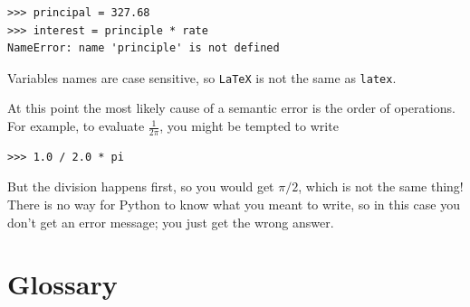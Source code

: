\documentclass[10pt]{book}
\begin{document}
\begin{verbatim}
>>> principal = 327.68
>>> interest = principle * rate
NameError: name 'principle' is not defined
\end{verbatim}
%
Variables names are case sensitive, so {\tt LaTeX} is not the
same as {\tt latex}.

At this point the most likely cause of a semantic error is
the order of operations.  For example, to evaluate
 $\frac{1}{2 \pi}$,
you might be tempted to write

\begin{verbatim}
>>> 1.0 / 2.0 * pi
\end{verbatim}
%
But the division happens first, so you would get $\pi / 2$, which
is not the same thing!  There is no way for Python
to know what you meant to write, so in this case you don't
get an error message; you just get the wrong answer.


\section{Glossary}
\end{document}
